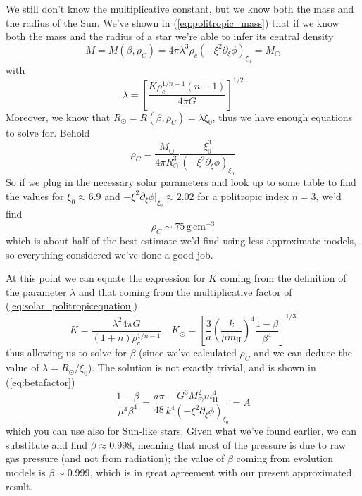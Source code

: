 \par We still don't know the multiplicative constant, but we know both the mass and the radius of the Sun. We've shown in (\ref{eq:politropic_mass}) that if we know both the mass and the radius of a star we're able to infer its central density
\begin{equation*}
	 M = M(\beta, \rho_{C})= 4\pi \lambda^{3}\rho_{c}(-\xi^{2}\partial_{\xi}\phi)_{\xi_{0}} = M_{\odot}
\end{equation*}
with 
\begin{equation*}
    \lambda = \left[\frac{K\rho_{c}^{1/n-1}(n+1)}{4\pi G}\right]^{1/2}
\end{equation*}
Moreover, we know that $R_{\odot} = R(\beta, \rho_{C}) =  \lambda\xi_{0}$, thus we have enough equations to solve for. Behold
\begin{equation*}
	\rho_{C} = \frac{M_{\odot}}{4\pi R_{\odot}^{3}}\frac{\xi_{0}^{3}}{(-\xi^{2}\partial_{\xi}\phi)_{\xi_{0}}}
\end{equation*}
So if we plug in the necessary solar parameters and look up to some table to find the values for $\xi_{0} \approx 6.9$ and $-\xi^{2}\partial_{\xi}\phi|_{\xi_{0}} \approx 2.02$ for a politropic index $n=3$, we'd find
\begin{equation*}
	\rho_{C} \sim 75\,\text{g}\,\text{cm}^{-3}
\end{equation*}
which is about half of the best estimate we'd find using less approximate models, so everything considered we've done a good job.
\par At this point we can equate the expression for $K$ coming from the definition of the parameter $\lambda$ and that coming from the multiplicative factor of (\ref{eq:solar_politropicequation})
\begin{equation*}
	K = \frac{\lambda^{2} 4 \pi G}{(1+n)\rho_{c}^{1/n-1}} \quad K_{\odot} = \left[\frac{3}{a}\left(\frac{k}{\mu m_{\text{H}}}\right)^{4}\frac{1-\beta}{\beta^{4}}\right]^{1/3}
\end{equation*}
thus allowing us to solve for $\beta$ (since we've calculated $\rho_{C}$ and we can deduce the value of $\lambda = R_{\odot}/\xi_{0}$). The solution is not exactly trivial, and is shown in (\ref{eq:betafactor})
\begin{equation}
	\frac{1-\beta}{\mu^{4} \beta^{4}} = \frac{a\pi}{48}\frac{G^{3}M_{\odot}^{2}m_{\text{H}}^{4}}{k^{4}(-\xi^{2}\partial_{\xi}\phi)_{\xi_{0}}} = A
	\label{eq:betafactor}
\end{equation}
which you can use also for Sun-like stars. Given what we've found earlier, we can substitute and find $\beta \approx 0.998$, meaning that most of the pressure is due to raw gas pressure (and not from radiation); the value of $\beta$ coming from evolution models is $\beta\sim0.999$, which is in great agreement with our present approximated result.

